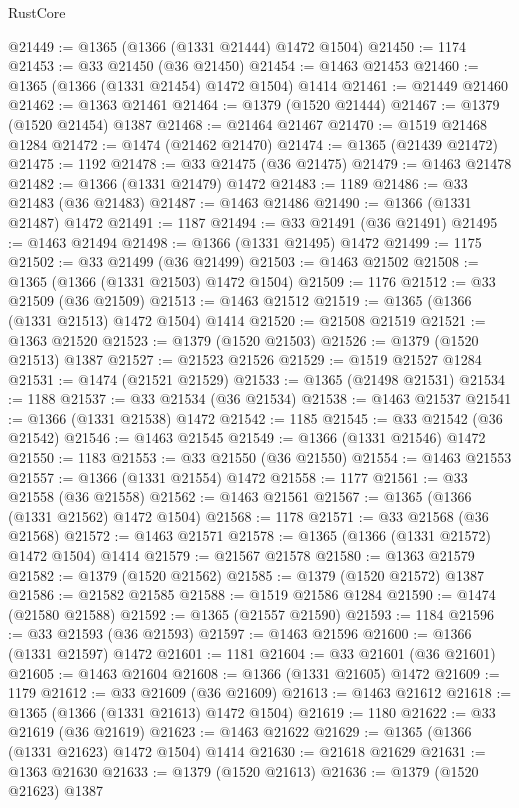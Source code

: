 \begin{lexlean}{RustCore}
\begin{coremodule}
@21449 := @1365 (@1366 (@1331 @21444) @1472 @1504)
@21450 := 1174
@21453 := @33 @21450 (@36 @21450)
@21454 := @1463 @21453
@21460 := @1365 (@1366 (@1331 @21454) @1472 @1504) @1414
@21461 := @21449 @21460
@21462 := @1363 @21461
@21464 := @1379 (@1520 @21444)
@21467 := @1379 (@1520 @21454) @1387
@21468 := @21464 @21467
@21470 := @1519 @21468 @1284
@21472 := @1474 (@21462 @21470)
@21474 := @1365 (@21439 @21472)
@21475 := 1192
@21478 := @33 @21475 (@36 @21475)
@21479 := @1463 @21478
@21482 := @1366 (@1331 @21479) @1472
@21483 := 1189
@21486 := @33 @21483 (@36 @21483)
@21487 := @1463 @21486
@21490 := @1366 (@1331 @21487) @1472
@21491 := 1187
@21494 := @33 @21491 (@36 @21491)
@21495 := @1463 @21494
@21498 := @1366 (@1331 @21495) @1472
@21499 := 1175
@21502 := @33 @21499 (@36 @21499)
@21503 := @1463 @21502
@21508 := @1365 (@1366 (@1331 @21503) @1472 @1504)
@21509 := 1176
@21512 := @33 @21509 (@36 @21509)
@21513 := @1463 @21512
@21519 := @1365 (@1366 (@1331 @21513) @1472 @1504) @1414
@21520 := @21508 @21519
@21521 := @1363 @21520
@21523 := @1379 (@1520 @21503)
@21526 := @1379 (@1520 @21513) @1387
@21527 := @21523 @21526
@21529 := @1519 @21527 @1284
@21531 := @1474 (@21521 @21529)
@21533 := @1365 (@21498 @21531)
@21534 := 1188
@21537 := @33 @21534 (@36 @21534)
@21538 := @1463 @21537
@21541 := @1366 (@1331 @21538) @1472
@21542 := 1185
@21545 := @33 @21542 (@36 @21542)
@21546 := @1463 @21545
@21549 := @1366 (@1331 @21546) @1472
@21550 := 1183
@21553 := @33 @21550 (@36 @21550)
@21554 := @1463 @21553
@21557 := @1366 (@1331 @21554) @1472
@21558 := 1177
@21561 := @33 @21558 (@36 @21558)
@21562 := @1463 @21561
@21567 := @1365 (@1366 (@1331 @21562) @1472 @1504)
@21568 := 1178
@21571 := @33 @21568 (@36 @21568)
@21572 := @1463 @21571
@21578 := @1365 (@1366 (@1331 @21572) @1472 @1504) @1414
@21579 := @21567 @21578
@21580 := @1363 @21579
@21582 := @1379 (@1520 @21562)
@21585 := @1379 (@1520 @21572) @1387
@21586 := @21582 @21585
@21588 := @1519 @21586 @1284
@21590 := @1474 (@21580 @21588)
@21592 := @1365 (@21557 @21590)
@21593 := 1184
@21596 := @33 @21593 (@36 @21593)
@21597 := @1463 @21596
@21600 := @1366 (@1331 @21597) @1472
@21601 := 1181
@21604 := @33 @21601 (@36 @21601)
@21605 := @1463 @21604
@21608 := @1366 (@1331 @21605) @1472
@21609 := 1179
@21612 := @33 @21609 (@36 @21609)
@21613 := @1463 @21612
@21618 := @1365 (@1366 (@1331 @21613) @1472 @1504)
@21619 := 1180
@21622 := @33 @21619 (@36 @21619)
@21623 := @1463 @21622
@21629 := @1365 (@1366 (@1331 @21623) @1472 @1504) @1414
@21630 := @21618 @21629
@21631 := @1363 @21630
@21633 := @1379 (@1520 @21613)
@21636 := @1379 (@1520 @21623) @1387

\end{coremodule}
\end{lexlean}
